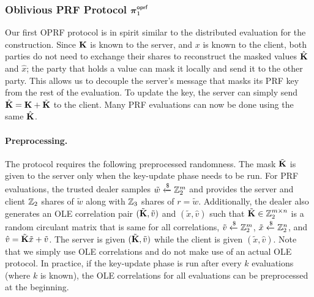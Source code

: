 \subsubsection{Oblivious PRF Protocol $\boldsymbol{\pi}^{\textsf{oprf}}_1$}
\label{subsec:oprf1}
Our first OPRF protocol is in spirit similar to the distributed evaluation for the \ttwPRF construction. Since $\mat{K}$ is known to the server, and $x$ is known to the client, both parties do not need to exchange their shares to reconstruct the masked values $\hat{\mat{K}}$ and $\hat{x}$; the party that holds a value can mask it locally and send it to the other party. This allows us to decouple the server's message that masks its PRF key from the rest of the evaluation. To update the key, the server can simply send $\hat{\mat{K}} = \mat{K} + \tilde{\mat{K}}$ to the client. Many PRF evaluations can now be done using the same $\hat{\mat{K}}$.

\paragraph{Preprocessing.} The protocol requires the following preprocessed randomness. The mask $\tilde{\mat{K}}$ is given to the server only when the key-update phase needs to be run. For PRF evaluations, the trusted dealer samples $\tilde{w} \xleftarrow{\$} \mathbb{Z}_2^m$ and provides the server and client $\mathbb{Z}_2$ shares of $\tilde{w}$ along with $\mathbb{Z}_3$ shares of $r = \tilde{w}$. Additionally, the dealer also generates an OLE correlation pair $(\tilde{\mat{K}}, \tilde{v})$ and $(\tilde{x}, \hat{v})$ such that $\tilde{\mat{K}} \in \Z_2^{m \times n}$ is a random circulant matrix that is same for all correlations, $\tilde{v} \xleftarrow{\$} \mathbb{Z}_2^m$, $\tilde{x} \xleftarrow{\$} \mathbb{Z}_2^n$, and $\hat{v} = \tilde{\mat{K}}\tilde{x} + \tilde{v}$. The server is given $(\tilde{\mat{K}}, \tilde{v})$ while the client is given $(\tilde{x}, \hat{v})$. Note that we simply use OLE correlations and do not make use of an actual OLE protocol. In practice, if the key-update phase is run after every $k$ evaluations (where $k$ is known), the OLE correlations for all evaluations can be preprocessed at the beginning. 

